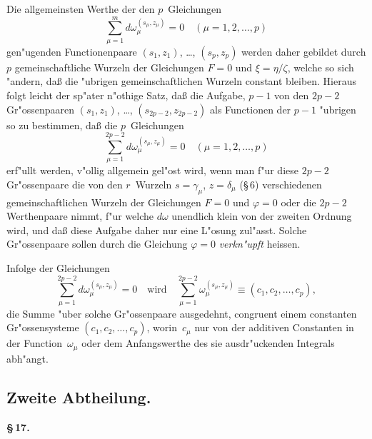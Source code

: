 \documentclass[12pt,a4paper]{book}
\theoremstyle{definition}
\theoremstyle{remark}
\begin{document}
Die allgemeinsten Werthe der den $p$~Gleichungen
\[
\sum_{\mu=1}^{m} d\omega_\mu^{(s_\mu,z_\mu)} = 0
\quad (\mu = 1, 2, \ldots, p)
\]
gen"ugenden Functionenpaare $(s_1,z_1)$, \ldots, $(s_p,z_p)$ werden daher
gebildet durch $p$ gemeinschaftliche Wurzeln der Gleichungen $F = 0$ und
$\xi = \eta/\zeta$, welche so sich "andern, da\ss{} die "ubrigen gemeinschaftlichen
Wurzeln constant bleiben. Hieraus folgt leicht der sp"ater n"othige Satz,
da\ss{} die Aufgabe, $p - 1$ von den $2p - 2$ Gr"ossenpaaren $(s_1,z_1)$,
\ldots, $(s_{2p-2}, z_{2p-2})$ als Functionen der $p - 1$ "ubrigen so zu bestimmen,
da\ss{} die $p$~Gleichungen
\[
\sum_{\mu=1}^{2p-2} d\omega_\mu^{(s_\mu,z_\mu)} = 0
\quad (\mu = 1, 2, \ldots, p)
\]
erf"ullt werden, v"ollig allgemein gel"ost wird, wenn man f"ur diese
$2p - 2$ Gr"ossenpaare die von den $r$~Wurzeln $s = \gamma_\mu$, $z = \delta_\mu$
(\S\,6) verschiedenen gemeinschaftlichen Wurzeln der Gleichungen $F = 0$
und $\varphi = 0$ oder die $2p - 2$ Werthenpaare nimmt, f"ur welche $d\omega$
unendlich klein von der zweiten Ordnung wird, und da\ss{} diese Aufgabe
daher nur eine L"osung zul"asst. Solche Gr"ossenpaare sollen durch die
Gleichung $\varphi = 0$ \emph{verkn"upft} heissen.

Infolge der Gleichungen
\[
\sum_{\mu=1}^{2p-2} d\omega_\mu^{(s_\mu,z_\mu)} = 0
\quad\text{wird}\quad
\sum_{\mu=1}^{2p-2} \omega_\mu^{(s_\mu,z_\mu)} \equiv (c_1, c_2, \ldots, c_p),
\]
die Summe "uber solche Gr"ossenpaare ausgedehnt, congruent einem
constanten Gr"ossensysteme $(c_1, c_2, \ldots, c_p)$, worin~$c_\mu$ nur von der
additiven Constanten in der Function~$\omega_\mu$ oder dem Anfangswerthe des
sie ausdr"uckenden Integrals abh"angt.

\newpage
\subsection*{Zweite Abtheilung.}

\medskip
\textbf{\S\,17.}
\end{document}
